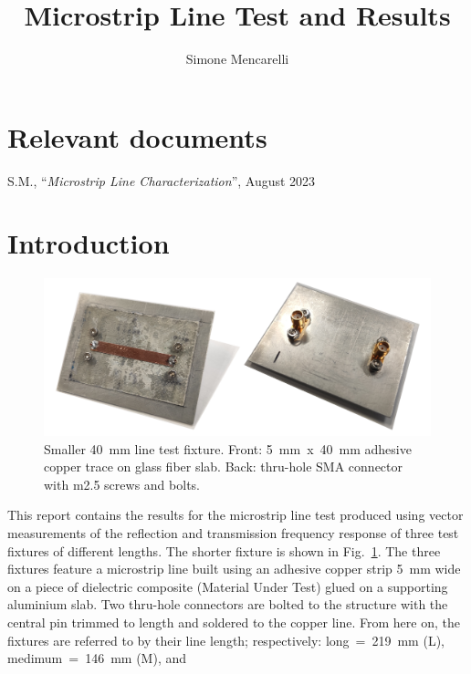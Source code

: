 \documentclass[11pt,a4paper]{article}
\title{Microstrip Line Test and Results}
\author{Simone Mencarelli}
\newcommand{\fig}[1]{Fig.~\ref{#1}}
\newcommand{\laser}[1]{``#1''}
\begin{document}
    \maketitle


    \section{Relevant documents}
    \label{sec:relevant-documents}
    \begin{enumerate}[start=1,label={[Doc\arabic*]}]
        \item S.M., \laser{\emph{Microstrip Line Characterization}}, August 2023 \label{doc:microstrip-characterization}
    \end{enumerate}


    \section{Introduction}
    \label{sec:introduction}
    \begin{figure}[!h]
        \includegraphics[width=\textwidth]{fixture}
        \caption{Smaller 40~mm line test fixture. Front: 5~mm~x~40~mm adhesive copper trace on glass fiber slab.
        Back: thru-hole SMA connector with m2.5 screws and bolts.}
        \label{fig:photo}
    \end{figure}
    This report contains the results for the microstrip line test produced using vector measurements of the reflection
    and transmission frequency response of three test fixtures of different lengths.
    The shorter fixture is shown in \fig{fig:photo}.
    The three fixtures feature a microstrip line built using an adhesive copper strip 5~mm wide on a piece of dielectric
    composite (Material Under Test) glued on a supporting aluminium slab.
    Two thru-hole connectors are bolted to the structure with the central pin trimmed to length and soldered to the copper line.
    From here on, the fixtures are referred to by their line length; respectively: long~=~219~mm (L), medimum~=~146~mm (M), and
\end{document}
